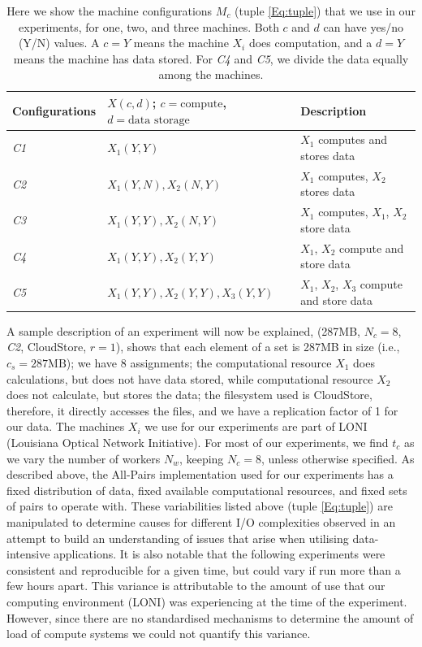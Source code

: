 \documentclass{rspublic}
\begin{document}
\begin{table}
\begin{center}
    \begin{tabular}{ | l | l | l |}
    \hline
    Configurations & $X(c,d)$; $c= \mbox{compute}$, $d=\mbox{data storage}$ & Description  \\ \hline
    \textit{C1} & $X_1(Y,Y)$  & $X_1$ computes and stores data\\ \hline    
    \textit{C2} & $X_1(Y,N), X_2(N,Y)$  & $X_1$ computes, $X_2$ stores data \\ \hline
    \textit{C3} & $X_1(Y,Y), X_2(N,Y)$  & $X_1$ computes, $X_1$, $X_2$ store data \\ \hline
    \textit{C4} & $X_1(Y,Y), X_2(Y,Y)$  & $X_1$, $X_2$ compute and store data \\ \hline
    \textit{C5} & $X_1(Y,Y), X_2(Y,Y), X_3(Y,Y)$  & $X_1$, $X_2$, $X_3$ compute and store data \\ 
    \hline
    \end{tabular}
\end{center}
    \caption{Here we show the machine configurations $M_c$ (tuple
\ref{Eq:tuple}) that we use in our experiments, for one, two, and three
machines. Both $c$ and $d$ can have yes/no (Y/N) values. A $c = Y$ means
the machine $X_i$ does computation, and a $d = Y$ means the machine has
data stored. For \textit{C4} and \textit{C5}, we divide the data equally among the
machines.}
    \label{Tab:Configs}
\end{table}


A sample description of an experiment will now be explained, 
(287MB, $N_c=8$, \textit{C2}, CloudStore, $r=1$),
shows that each element of a set is 287MB in size (i.e., $c_s=287\mbox{MB}$); we have 8
assignments; the computational resource $X_1$ does calculations, but
does not have data stored, while computational resource $X_2$ does not
calculate, but stores the data; the filesystem used is CloudStore, therefore, it
directly accesses the files, and we have a replication factor of 1 for our
data. The machines $X_i$ we use for our experiments are part of LONI
(Louisiana Optical Network Initiative). For most of our experiments, we
find $t_c$ as we vary the number of workers $N_w$, keeping $N_c=8$,
 unless otherwise specified. As described
above, the All-Pairs implementation used for our experiments has a fixed
distribution of data, fixed available computational resources, and fixed
sets of pairs to operate with. These variabilities listed above (tuple
\ref{Eq:tuple}) are manipulated to determine causes for different I/O
complexities observed in an attempt to build an understanding of issues
that arise when utilising data-intensive applications. It is also
notable that the following experiments were consistent and reproducible
for a given time, but could vary if run more than a few hours apart.
This variance is attributable to the amount of use that our computing
environment (LONI) was experiencing at the time of the experiment.
However, since there are no standardised mechanisms to determine the
amount of load of compute systems we could not quantify this variance.
\end{document}
